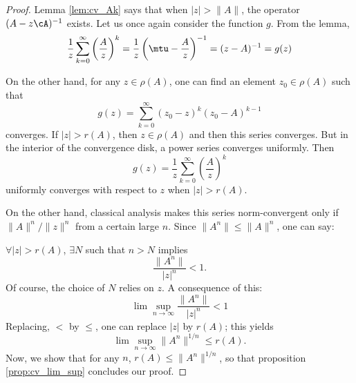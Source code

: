\begin{proof}
	Lemma \ref{lem:cv_Ak} says that when $|z|>\|A\|$, the operator $(A-z\cA)^{-1}$ exists. Let us once again consider the function $g$. From the lemma,
	\begin{equation}
	\frac{1}{z}\sum_{k=0}^{\infty}\left(\frac{A}{z}\right)^k=\frac{1}{z}\left(\mtu-\frac{A}{z}\right)^{-1}
						  =(z-A)^{-1}\\
						  =g(z)
	\end{equation}

	On the other hand, for any $z\in\rho(A)$, one can find an element $z_0\in\rho(A)$ such that
	\[
	   g(z)=\sum_{k=0}^{\infty}(z_0-z)^k(z_0-A)^{k-1}
	\]
	converges. If $|z|>r(A)$, then $z\in\rho(A)$ and then this series converges. But in the interior of the convergence disk, a power series converges uniformly. Then
	\[
	  g(z)=\frac{1}{z}\sum_{k=0}^{\infty}\left(\frac{A}{z}\right)^k
	\]
	uniformly converges with respect to $z$ when $|z|>r(A)$.

	On the other hand, classical analysis makes this series norm-convergent only if $\|A\|^n/\|z\|^n$ from a certain large $n$. Since $\|A^n\|\leq\|A\|^n$, one can say:

	$\forall |z|>r(A)$, $\exists N$  such that $n>N$ implies
	\[
	   \frac{\|A^n\|}{|z|^n}<1.
	\]
	Of course, the choice of $N$ relies on $z$. A consequence of this:
	\[
	   \lim\sup_{n\to\infty}\frac{\|A^n\|}{|z|^n}<1
	\]
	Replacing, $<$ by $\leq$, one can replace $|z|$ by $r(A)$; this yields
	\begin{equation}
	   \lim\sup_{n\to\infty} \|A^n\|^{1/n}\leq r(A).
	\end{equation}
	Now, we show that for any $n$, $r(A)\leq\|A^n\|^{1/n}$, so that proposition \ref{prop:cv_lim_sup} concludes our proof.


\end{proof}
